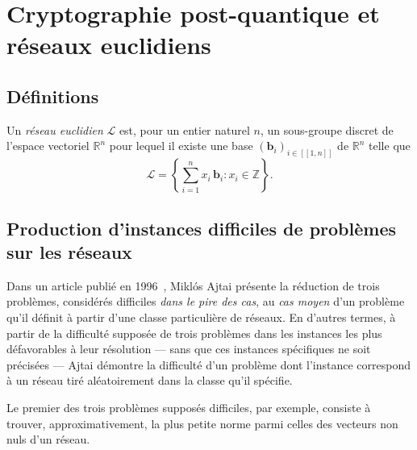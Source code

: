
\section{Cryptographie post-quantique et réseaux euclidiens} %
\label{sec:reseaux}




\subsection{Définitions}
Un \emph{réseau euclidien} $\mathcal{L}$ est, pour un entier naturel $n$, un sous-groupe discret de l’espace vectoriel $\mathbb{R}^n$ pour lequel il existe une base $(\mathbf{b}_i)_{i\in[\![1, n]\!]}$ de $\mathbb{R}^n$ telle que
\[
\mathcal{L} =\left\{ \sum^n_{i=1} x_i\,\mathbf{b}_i : x_i \in \mathbb Z\right\}\text{.}
\]


\subsection{Production d'instances difficiles de problèmes sur les réseaux}

Dans un article publié en 1996~\cite{STOC:Ajtai96}, Miklós Ajtai présente la réduction de trois problèmes, considérés
difficiles \emph{dans le pire des cas}, au \emph{cas moyen} d’un problème qu’il définit à partir
d’une classe particulière de réseaux.
En d’autres termes, à partir de la difficulté supposée de trois problèmes dans les instances les
plus défavorables à leur résolution --- sans que ces instances spécifiques ne soit précisées ---
Ajtai démontre la difficulté d’un problème dont l’instance correspond à un réseau tiré aléatoirement
dans la classe qu’il spécifie.

Le premier des trois problèmes supposés difficiles, par exemple, consiste à trouver,
approximativement, la plus petite norme parmi celles des vecteurs non nuls d’un réseau.

